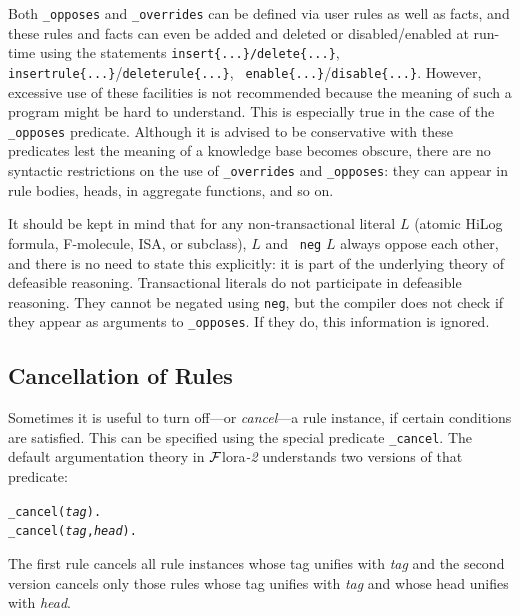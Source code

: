 \documentclass[11pt]{article}
\newcommand{\FLORA}{{\mbox{\sc ${\cal F}${lora}\rm\emph{-2}}}\xspace}
\begin{document}
Both {\tt \_opposes} and {\tt \_overrides} can be defined via user rules
as well as facts, and these rules and facts can even be added and deleted
or disabled/enabled
at run-time using the statements {\tt insert\{...\}/delete\{...\}}, {\tt
  insertrule\{...\}}/{\tt deleterule\{...\}}, {\tt
  enable\{...\}}/{\tt disable\{...\}}.
However, excessive use of these facilities
is not recommended because the meaning of such a
program might be hard to understand. This is especially true in the case of
the {\tt \_opposes} predicate.  Although it is advised
to be conservative with these predicates lest the meaning of a knowledge
base becomes obscure, there are no syntactic restrictions on the use of
{\tt \_overrides} and {\tt \_opposes}: they can appear in rule bodies,
heads, in aggregate functions, and so on.  

It should be kept in mind that for any non-transactional literal $L$
(atomic HiLog formula, F-molecule, ISA, or subclass), $L$ and {\tt
  neg} $L$ always oppose each other, and there is no need to state this
explicitly: it is part of the underlying theory of defeasible reasoning.
Transactional literals do not participate in defeasible reasoning.
They cannot be negated using {\tt neg}, but the compiler does not check if
they appear as arguments to {\tt \_opposes}. If they do, this information
is ignored.

\subsection{Cancellation of Rules}\label{sec-cancel}

Sometimes it is useful to turn off---or \emph{cancel}---a rule instance, if
certain conditions are satisfied. This can be specified using the special
predicate {\tt \_cancel}. The default argumentation theory in \FLORA  
understands two versions of that predicate:
\begin{alltt}
    _cancel(\textnormal{\textit{tag}}).
    _cancel(\textnormal{\textit{tag}},\textnormal{\textit{head}}).
\end{alltt}
The first rule cancels all rule instances whose tag unifies with
\emph{tag} and the second version cancels only those rules whose tag
unifies with \emph{tag} and whose head unifies with \emph{head}.   
\end{document}
